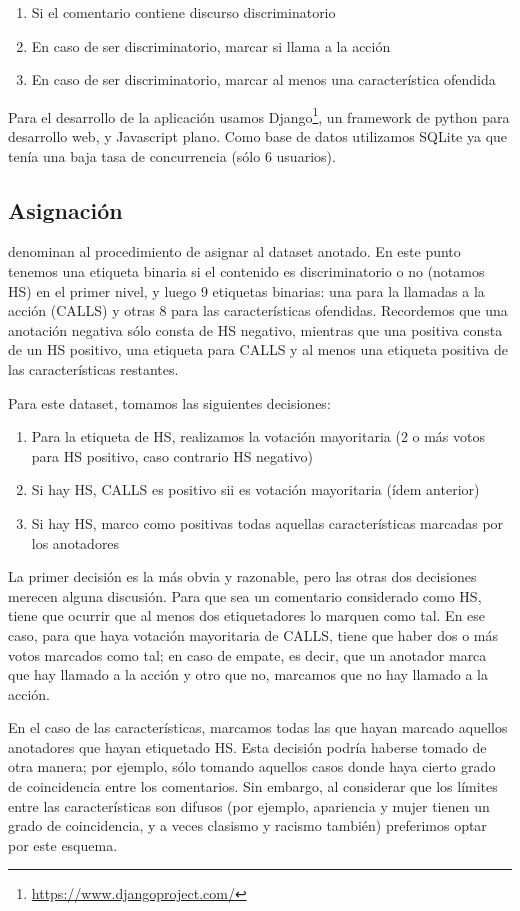 \begin{enumerate}
    \item Si el comentario contiene discurso discriminatorio
    \item En caso de ser discriminatorio, marcar si llama a la acción
    \item En caso de ser discriminatorio, marcar al menos una característica ofendida
\end{enumerate}

Para el desarrollo de la aplicación usamos Django\footnote{\url{https://www.djangoproject.com/}}, un framework de python para desarrollo web, y Javascript plano. Como base de datos utilizamos SQLite ya que tenía una baja tasa de concurrencia (sólo 6 usuarios).

\subsection{Asignación}

\citet{pustejovsky2012natural} denominan  al procedimiento de asignar  al dataset anotado. En este punto tenemos una etiqueta binaria si el contenido es discriminatorio o no (notamos HS) en el primer nivel, y luego 9 etiquetas binarias: una para la llamadas a la acción (CALLS) y otras 8 para las características ofendidas. Recordemos que una anotación negativa sólo consta de HS negativo, mientras que una positiva consta de un HS positivo, una etiqueta para CALLS y al menos una etiqueta positiva de las características restantes.

Para este dataset, tomamos las siguientes decisiones:

\begin{enumerate}
    \item Para la etiqueta de HS, realizamos la votación mayoritaria (2 o más votos para HS positivo, caso contrario HS negativo)
    \item Si hay HS, CALLS es positivo sii es votación mayoritaria (ídem anterior)
    \item Si hay HS, marco como positivas todas aquellas características marcadas por los anotadores
\end{enumerate}

La primer decisión es la más obvia y razonable, pero las otras dos decisiones merecen alguna discusión. Para que sea un comentario considerado como HS, tiene que ocurrir que al menos dos etiquetadores lo marquen como tal. En ese caso, para que haya votación mayoritaria de CALLS, tiene que haber dos o más votos marcados como tal; en caso de empate, es decir, que un anotador marca que hay llamado a la acción y otro que no, marcamos que no hay llamado a la acción.

En el caso de las características, marcamos todas las que hayan marcado aquellos anotadores que hayan etiquetado HS. Esta decisión podría haberse tomado de otra manera; por ejemplo, sólo tomando aquellos casos donde haya cierto grado de coincidencia entre los comentarios. Sin embargo, al considerar que los límites entre las características son difusos (por ejemplo, apariencia y mujer tienen un grado de coincidencia, y a veces clasismo y racismo también) preferimos optar por este esquema.

